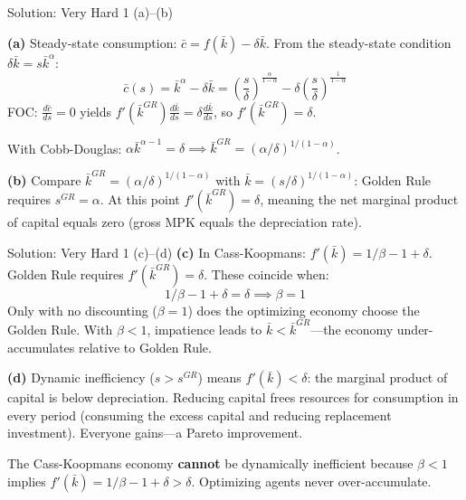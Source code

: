 \documentclass[aspectratio=169,10pt]{beamer}
\newcommand{\backbutton}[1]{\hfill\hyperlink{#1}{\beamerbutton{Back}}}
\begin{document}
\begin{frame}{Solution: Very Hard 1 (a)--(b)}
\hypertarget{s-v1}{}

\textbf{(a)} Steady-state consumption: $\bar{c} = f(\bar{k})-\delta\bar{k}$. From the steady-state condition $\delta\bar{k}=s\bar{k}^\alpha$:
\[
\bar{c}(s) = \bar{k}^\alpha - \delta\bar{k} = \left(\frac{s}{\delta}\right)^{\frac{\alpha}{1-\alpha}} - \delta\left(\frac{s}{\delta}\right)^{\frac{1}{1-\alpha}}
\]
FOC: $\frac{d\bar{c}}{ds}=0$ yields $f'(\bar{k}^{GR})\frac{d\bar{k}}{ds} = \delta\frac{d\bar{k}}{ds}$, so $f'(\bar{k}^{GR})=\delta$.

With Cobb-Douglas: $\alpha\bar{k}^{\alpha-1}=\delta \implies \bar{k}^{GR} = (\alpha/\delta)^{1/(1-\alpha)}$.

\medskip
\textbf{(b)} Compare $\bar{k}^{GR} = (\alpha/\delta)^{1/(1-\alpha)}$ with $\bar{k}=(s/\delta)^{1/(1-\alpha)}$: Golden Rule requires $s^{GR}=\alpha$. At this point $f'(\bar{k}^{GR})=\delta$, meaning the net marginal product of capital equals zero (gross MPK equals the depreciation rate).
\end{frame}

\begin{frame}{Solution: Very Hard 1 (c)--(d)}
\textbf{(c)} In Cass-Koopmans: $f'(\bar{k})=1/\beta-1+\delta$. Golden Rule requires $f'(\bar{k}^{GR})=\delta$. These coincide when:
\[
1/\beta-1+\delta=\delta \implies \beta=1
\]
Only with no discounting ($\beta=1$) does the optimizing economy choose the Golden Rule. With $\beta<1$, impatience leads to $\bar{k}<\bar{k}^{GR}$---the economy under-accumulates relative to Golden Rule.

\medskip
\textbf{(d)} Dynamic inefficiency ($s>s^{GR}$) means $f'(\bar{k})<\delta$: the marginal product of capital is below depreciation. Reducing capital frees resources for consumption in every period (consuming the excess capital and reducing replacement investment). Everyone gains---a Pareto improvement.

The Cass-Koopmans economy \textbf{cannot} be dynamically inefficient because $\beta<1$ implies $f'(\bar{k})=1/\beta-1+\delta>\delta$. Optimizing agents never over-accumulate.
\backbutton{q-v1}
\end{frame}
\end{document}
